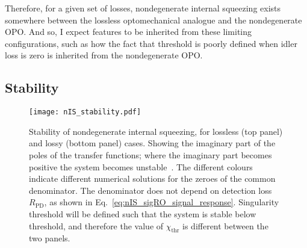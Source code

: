 Therefore, for a given set of losses, nondegenerate internal squeezing exists somewhere between the lossless optomechanical analogue and the nondegenerate OPO. And so, I expect features to be inherited from these limiting configurations, such as how the fact that threshold is poorly defined when idler loss is zero is inherited from the nondegenerate OPO.


\subsection{Stability}
\label{sec:nIS_stability}

\begin{figure}
	\centering
	\texttt{[image: nIS\_stability.pdf]}
	\caption{  Stability of nondegenerate internal squeezing, for lossless (top panel) and lossy (bottom panel) cases. Showing the imaginary part of the poles of the transfer functions; where the imaginary part becomes positive the system becomes unstable~\cite{}. The different colours indicate different numerical solutions for the zeroes of the common denominator. The denominator does not depend on detection loss $R_\text{PD}$, as shown in Eq.~\ref{eq:nIS_sigRO_signal_response}. Singularity threshold will be defined such that the system is stable below threshold, and therefore the value of $\chi_\text{thr}$ is different between the two panels.}
	\label{fig:nIS_stability}
\end{figure}

